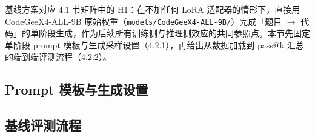 
基线方案对应 4.1 节矩阵中的 H1：在不加任何 LoRA 适配器的情形下，直接用 CodeGeeX4-ALL-9B 原始权重（\texttt{models/CodeGeeX4-ALL-9B/}）完成「题目 $\to$ 代码」的单阶段生成，作为后续所有训练侧与推理侧效应的共同参照点。本节先固定单阶段 prompt 模板与生成采样设置（4.2.1），再给出从数据加载到 pass@k 汇总的端到端评测流程（4.2.2）。

\subsection{Prompt 模板与生成设置}


\subsection{基线评测流程}

